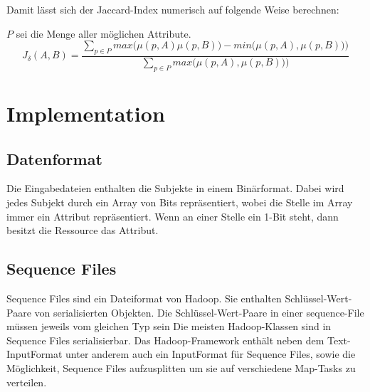\documentclass[a4paper]{llncs}
\begin{document}
Damit lässt sich der Jaccard-Index numerisch auf folgende Weise berechnen:

$P$ sei die Menge aller möglichen Attribute.
$$J_{\delta}(A,B) = \frac{\sum\limits_{p \in P}max\bigl(\mu(p, A)\mu(p, B)\bigr) - min\bigl(\mu(p, A),\mu(p, B))\bigr)}{\sum\limits_{p \in P}max\bigl(\mu(p, A),\mu(p, B))\bigr)}$$

\section{Implementation}

\subsection{Datenformat}
Die Eingabedateien enthalten die Subjekte in einem Binärformat. Dabei wird jedes Subjekt durch ein Array von Bits repräsentiert, wobei die Stelle im Array immer ein Attribut repräsentiert. Wenn an einer Stelle ein 1-Bit steht, dann besitzt die Ressource das Attribut.

\subsection{Sequence Files}
Sequence Files sind ein Dateiformat von Hadoop. Sie enthalten Schlüssel-Wert-Paare von serialisierten Objekten. Die Schlüssel-Wert-Paare in einer sequence-File müssen jeweils vom gleichen Typ sein 
Die meisten Hadoop-Klassen sind in Sequence Files serialisierbar.
Das Hadoop-Framework enthält neben dem Text-InputFormat unter anderem auch ein InputFormat für Sequence Files, sowie die Möglichkeit, Sequence Files aufzusplitten um sie auf verschiedene Map-Tasks zu verteilen.
\end{document}
